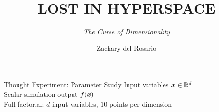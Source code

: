 \documentclass[14pt]{beamer}
\title{LOST IN HYPERSPACE}
\subtitle{\emph{The Curse of Dimensionality}}
\author{Zachary del Rosario}
\institute{zdr@stanford.edu}
\date{}
\begin{document}
\begin{frame}[plain]
\maketitle
\end{frame}

\begin{frame}[t]{Thought Experiment: Parameter Study}
  Input variables $\boldsymbol{x}\in\mathbb{R}^{d}$ \\
  Scalar simulation output $f(\boldsymbol{x})$ \\
  Full factorial: $d$ input variables, $10$ points per dimension \\

  \bigskip
\end{frame}
\end{document}
